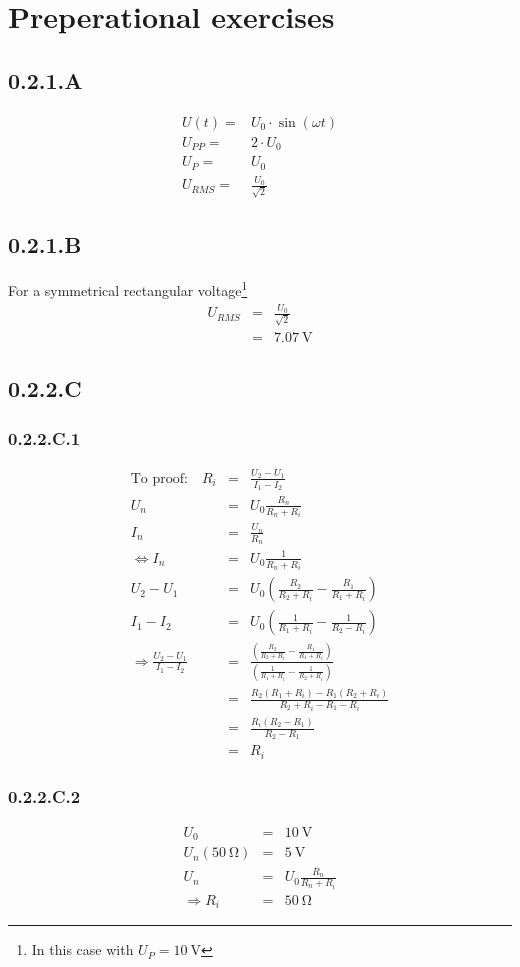\section{Preperational exercises}
\subsection{0.2.1.A}
\begin{eqnarray*}
U(t)=&U_0\cdot\sin(\omega t)\\
U_{PP}=&2\cdot U_0\\
U_P=&U_0\\
U_{RMS}=&\frac{U_0}{\sqrt{2}}
\end{eqnarray*}
\subsection{0.2.1.B}
For a symmetrical rectangular voltage\footnote{In this case with $U_P=\SI{10}{\volt}$} 
\begin{eqnarray*}
	U_{RMS}&=&\frac{U_0}{\sqrt{2}}\\
	&=&\SI{7.07}{\volt}
\end{eqnarray*}
\subsection{0.2.2.C}
\subsubsection{0.2.2.C.1}
\begin{eqnarray*}
	\text{To proof:} \quad R_i&=&\frac{U_2-U_1}{I_1-I_2}\\
	U_n&=&U_0\frac{R_n}{R_n+R_i}\\
	I_n&=&\frac{U_n}{R_n}\\
	\Leftrightarrow I_n&=&U_0\frac{1}{R_n+R_i}\\
	U_2-U_1&=&U_0\left(\frac{R_2}{R_2+R_i}-\frac{R_1}{R_1+R_i}\right)\\
	I_1-I_2&=&U_0\left(\frac{1}{R_1+R_i}-\frac{1}{R_2-R_i}\right)\\
	\Rightarrow\frac{U_2-U_1}{I_1-I_2}&=&\frac{\left(\frac{R_2}{R_2+R_i}-\frac{R_1}{R_1+R_i}\right)}{\left(\frac{1}{R_1+R_i}-\frac{1}{R_2+R_i}\right)}\\
	&=&\frac{R_2\left(R_1+R_i\right)-R_1\left(R_2+R_i\right)}{R_2+R_i-R_1-R_i}\\
	&=&\frac{R_i\left(R_2-R_1\right)}{R_2-R_1}\\
	&=&R_i
\end{eqnarray*}
\subsubsection{0.2.2.C.2}
\begin{eqnarray*}
	U_0&=&\SI{10}{\volt}\\
	U_n(\SI{50}{\ohm})&=&\SI{5}{\volt}\\
	U_n&=&U_0\frac{R_n}{R_n+R_i}\\
	\Rightarrow R_i&=&\SI{50}{\ohm}
\end{eqnarray*}
